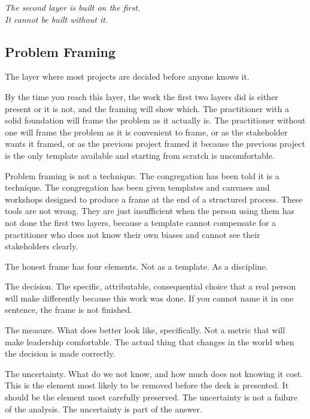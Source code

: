 \begin{center}\small\itshape
  The second layer is built on the first.\\
  It cannot be built without it.
\end{center}

\subsection*{Problem Framing}

The layer where most projects are decided before anyone knows it.

By the time you reach this layer, the work the first two layers did is either present or it is not, and the framing will show which. The practitioner with a solid foundation will frame the problem as it actually is. The practitioner without one will frame the problem as it is convenient to frame, or as the stakeholder wants it framed, or as the previous project framed it because the previous project is the only template available and starting from scratch is uncomfortable.

Problem framing is not a technique. The congregation has been told it is a technique. The congregation has been given templates and canvases and workshops designed to produce a frame at the end of a structured process. These tools are not wrong. They are just insufficient when the person using them has not done the first two layers, because a template cannot compensate for a practitioner who does not know their own biases and cannot see their stakeholders clearly.

The honest frame has four elements. Not as a template. As a discipline.

The decision. The specific, attributable, consequential choice that a real person will make differently because this work was done. If you cannot name it in one sentence, the frame is not finished.

The measure. What does better look like, specifically. Not a metric that will make leadership comfortable. The actual thing that changes in the world when the decision is made correctly.

The uncertainty. What do we not know, and how much does not knowing it cost. This is the element most likely to be removed before the deck is presented. It should be the element most carefully preserved. The uncertainty is not a failure of the analysis. The uncertainty is part of the answer.


